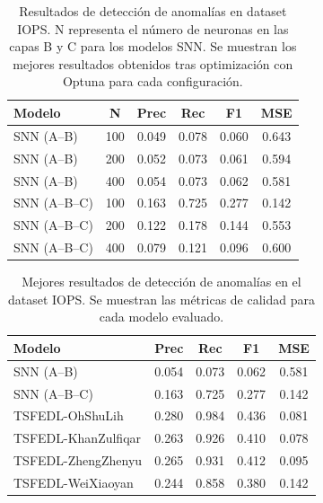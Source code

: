 \begin{table}[htbp]
\centering
\small
\begin{tabular}{lccccc}
\hline\hline
\textbf{Modelo} & \textbf{N} & \textbf{Prec} & \textbf{Rec} & \textbf{F1} & \textbf{MSE} \\
\hline
SNN (A--B) & 100 & 0.049 & 0.078 & 0.060 & 0.643 \\
SNN (A--B) & 200 & 0.052 & 0.073 & 0.061 & 0.594 \\
SNN (A--B) & 400 & 0.054 & 0.073 & 0.062 & 0.581 \\
\hline
SNN (A--B--C) & 100 & 0.163 & 0.725 & 0.277 & 0.142 \\
SNN (A--B--C) & 200 & 0.122 & 0.178 & 0.144 & 0.553 \\
SNN (A--B--C) & 400 & 0.079 & 0.121 & 0.096 & 0.600 \\
\hline\hline
\end{tabular}
\caption{Resultados de detección de anomalías en dataset IOPS. N representa el número de neuronas en las capas B y C para los modelos SNN. Se muestran los mejores resultados obtenidos tras optimización con Optuna para cada configuración.}
\label{tab:resultados-iops-escalabilidad}
\end{table}


\begin{table}[htbp]
\centering
\small
\begin{tabular}{lcccc}
\hline\hline
\textbf{Modelo} & \textbf{Prec} & \textbf{Rec} & \textbf{F1} & \textbf{MSE} \\
\hline
SNN (A--B) & 0.054 & 0.073 & 0.062 & 0.581 \\
SNN (A--B--C) & 0.163 & 0.725 & 0.277 & 0.142 \\
TSFEDL-OhShuLih & 0.280 & 0.984 & 0.436 & 0.081 \\
TSFEDL-KhanZulfiqar & 0.263 & 0.926 & 0.410 & 0.078 \\
TSFEDL-ZhengZhenyu & 0.265 & 0.931 & 0.412 & 0.095 \\
TSFEDL-WeiXiaoyan & 0.244 & 0.858 & 0.380 & 0.142 \\
\hline\hline
\end{tabular}
\caption{Mejores resultados de detección de anomalías en el dataset IOPS. Se muestran las métricas de calidad para cada modelo evaluado.}
\label{tab:resultados-iops}
\end{table}


